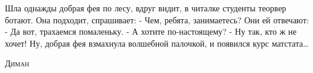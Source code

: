 \documentclass[../TV&MS.tex]{subfiles}
\begin{document}
\epigraph{Шла однажды добрая фея по лесу, вдруг видит, в читалке студенты теорвер ботают. Она подходит, спрашивает:
- Чем, ребята, занимаетесь?
Они ей отвечают:
- Да вот, трахаемся помаленьку.
- А хотите по-настоящему?
- Ну так, кто ж не хочет!
Ну, добрая фея взмахнула волшебной палочкой, и появился курс матстата\ldots}%
{\textsc{Диман}}

\newpage
\end{document}
